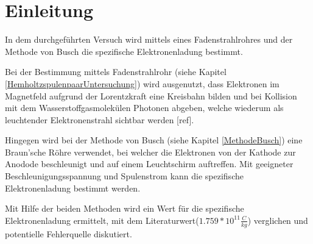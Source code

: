 \chapter{Einleitung}
\label{Einleitung}
In dem durchgeführten Versuch wird mittels eines Fadenstrahlrohres und der Methode von Busch die spezifische Elektronenladung bestimmt. 

Bei der Bestimmung mittels Fadenstrahlrohr (siehe Kapitel \ref{HemholtzspulenpaarUntersuchung}) wird ausgenutzt, dass Elektronen im Magnetfeld aufgrund der Lorentzkraft eine Kreisbahn bilden und bei Kollision mit dem Wasserstoffgasmolekülen Photonen abgeben, welche wiederum als leuchtender Elektronenstrahl sichtbar werden [ref].

Hingegen wird bei der Methode von Busch (siehe Kapitel \ref{MethodeBusch}) eine Braun'sche Röhre verwendet, bei welcher die Elektronen von der Kathode zur Anodode beschleunigt und auf einem Leuchtschirm auftreffen. Mit geeigneter Beschleunigungsspannung und Spulenstrom kann die spezifische Elektronenladung bestimmt werden.

Mit Hilfe der beiden Methoden wird ein Wert für die spezifische Elektronenladung ermittelt, mit dem Literaturwert($1.759*10^{11}\frac{C}{kg}$) \cite{uniElektLadung} verglichen und potentielle Fehlerquelle diskutiert.
